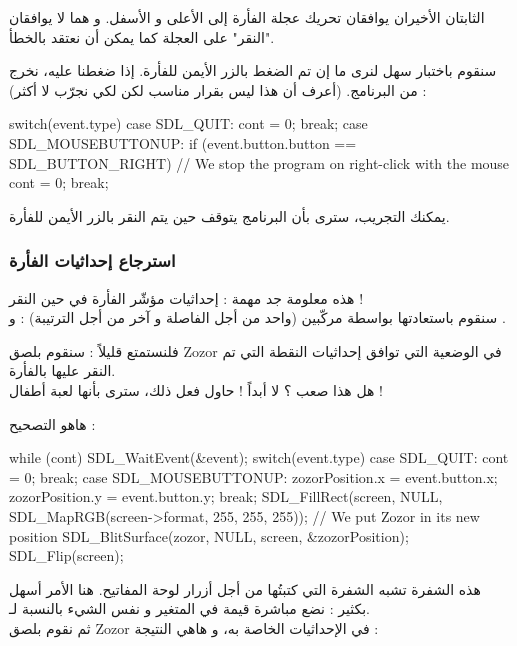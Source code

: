 \begin{information}
الثابتان الأخيران يوافقان تحريك عجلة الفأرة إلى الأعلى و الأسفل. و هما لا يوافقان "النقر" على العجلة كما يمكن أن نعتقد بالخطأ.
\end{information}

سنقوم باختبار سهل لنرى ما إن تم الضغط بالزر الأيمن للفأرة. إذا ضغطنا عليه، نخرج من البرنامج. (أعرف أن هذا ليس بقرار مناسب لكن لكي نجرّب لا أكثر) :

\begin{Csource}
switch(event.type)
{
	case SDL_QUIT:
	cont = 0;
	break;
	case SDL_MOUSEBUTTONUP:
	if (event.button.button == SDL_BUTTON_RIGHT) 
	// We stop the program on right-click with the mouse
		cont = 0;
	break;
}
\end{Csource}

يمكنك التجريب، سترى بأن البرنامج يتوقف حين يتم النقر بالزر الأيمن للفأرة.

\subsubsection{استرجاع إحداثيات الفأرة}

هذه معلومة جد مهمة : إحداثيات مؤشّر الفأرة في حين النقر !\\
سنقوم باستعادتها بواسطة مركّبين (واحد من أجل الفاصلة و آخر من أجل الترتيبة) :
و
.

فلنستمتع قليلاً : سنقوم بلصق 
\textenglish{Zozor}
في الوضعية التي توافق إحداثيات النقطة التي تم النقر عليها بالفأرة.\\
هل هذا صعب ؟ لا أبداً ! حاول فعل ذلك، سترى بأنها لعبة أطفال !

هاهو التصحيح :

\begin{Csource}
while (cont)
{
	SDL_WaitEvent(&event);
	switch(event.type)
	{
		case SDL_QUIT:
		cont = 0;
		break;
		case SDL_MOUSEBUTTONUP:
		zozorPosition.x = event.button.x;
		zozorPosition.y = event.button.y;
		break;
	}
	SDL_FillRect(screen, NULL, SDL_MapRGB(screen->format, 255, 255, 255));
	// We put Zozor in its new position
	SDL_BlitSurface(zozor, NULL, screen, &zozorPosition); 
	SDL_Flip(screen);
}
\end{Csource}

هذه الشفرة تشبه الشفرة التي كتبتُها من أجل أزرار لوحة المفاتيح. هنا الأمر أسهل بكثير : نضع مباشرة قيمة 
في المتغير  
و نفس الشيء بالنسبة لـ.\\
ثم نقوم بلصق
\textenglish{Zozor}
في الإحداثيات الخاصة به، و هاهي النتيجة :

